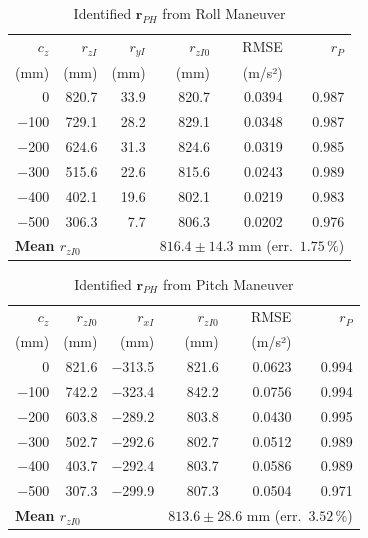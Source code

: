 \documentclass[conference]{IEEEtran}
\newcommand{\vv}[1]{\bm{#1}}          %
\newcommand{\rPH}{\vv{r}_{PH}}
\begin{document}
\begin{table}[!t]
  \caption{Identified $\rPH$ from Roll Maneuver}
  \label{tab:roll}
  \centering
  \renewcommand{\arraystretch}{1.15}
  \begin{tabular}{rrrrrr}
    \toprule
    $c_z$ & $r_{zI}$ & $r_{yI}$ & $r_{zI0}$ & RMSE & $r_P$ \\
    (mm)  & (mm)     & (mm)     & (mm)       & (m/s²) &  \\
    \midrule
      0   & 820.7 & 33.9  & 820.7 & 0.0394 & 0.987 \\
    $-$100 & 729.1 & 28.2  & 829.1 & 0.0348 & 0.987 \\
    $-$200 & 624.6 & 31.3  & 824.6 & 0.0319 & 0.985 \\
    $-$300 & 515.6 & 22.6  & 815.6 & 0.0243 & 0.989 \\
    $-$400 & 402.1 & 19.6  & 802.1 & 0.0219 & 0.983 \\
    $-$500 & 306.3 &  7.7  & 806.3 & 0.0202 & 0.976 \\
    \midrule
    \multicolumn{3}{l}{\textbf{Mean $r_{zI0}$}} &
      \multicolumn{3}{l}{$816.4 \pm 14.3$ mm (err.\ $1.75\,\%$)} \\
    \bottomrule
  \end{tabular}
\end{table}

\begin{table}[!t]
  \caption{Identified $\rPH$ from Pitch Maneuver}
  \label{tab:pitch}
  \centering
  \renewcommand{\arraystretch}{1.15}
  \begin{tabular}{rrrrrr}
    \toprule
    $c_z$ & $r_{zI0}$ & $r_{xI}$ & $r_{zI0}$ & RMSE & $r_P$ \\
    (mm)  & (mm)      & (mm)     & (mm)       & (m/s²) &  \\
    \midrule
      0   & 821.6 & $-$313.5 & 821.6 & 0.0623 & 0.994 \\
    $-$100 & 742.2 & $-$323.4 & 842.2 & 0.0756 & 0.994 \\
    $-$200 & 603.8 & $-$289.2 & 803.8 & 0.0430 & 0.995 \\
    $-$300 & 502.7 & $-$292.6 & 802.7 & 0.0512 & 0.989 \\
    $-$400 & 403.7 & $-$292.4 & 803.7 & 0.0586 & 0.989 \\
    $-$500 & 307.3 & $-$299.9 & 807.3 & 0.0504 & 0.971 \\
    \midrule
    \multicolumn{3}{l}{\textbf{Mean $r_{zI0}$}} &
      \multicolumn{3}{l}{$813.6 \pm 28.6$ mm (err.\ $3.52\,\%$)} \\
    \bottomrule
  \end{tabular}
\end{table}
\end{document}
